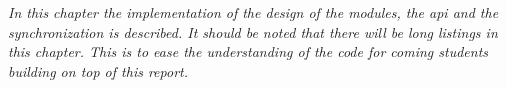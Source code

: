 \emph{In this chapter the implementation of the design of the modules, the \ac{api} and the synchronization is described. It should be noted that there will be long listings in this chapter. This is to ease the understanding of the code for coming students building on top of this report.} 